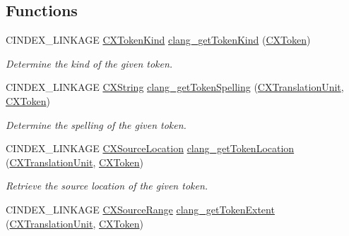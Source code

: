 \subsection*{Functions}
\begin{DoxyCompactItemize}
\item 
\mbox{\label{group__CINDEX__LEX_ga83f692a67fe4dbeea779f37c0a3b7f20}} 
C\+I\+N\+D\+E\+X\+\_\+\+L\+I\+N\+K\+A\+GE \mbox{\hyperlink{group__CINDEX__LEX_gaf63e37eee4280e2c039829af24bbc201}{C\+X\+Token\+Kind}} \mbox{\hyperlink{group__CINDEX__LEX_ga83f692a67fe4dbeea779f37c0a3b7f20}{clang\+\_\+get\+Token\+Kind}} (\mbox{\hyperlink{structCXToken}{C\+X\+Token}})
\begin{DoxyCompactList}\small\item\em Determine the kind of the given token. \end{DoxyCompactList}\item 
C\+I\+N\+D\+E\+X\+\_\+\+L\+I\+N\+K\+A\+GE \mbox{\hyperlink{structCXString}{C\+X\+String}} \mbox{\hyperlink{group__CINDEX__LEX_ga1033a25c9d2c59bcbdb23020de0bba2c}{clang\+\_\+get\+Token\+Spelling}} (\mbox{\hyperlink{group__CINDEX_gacdb7815736ca709ce9a5e1ec2b7e16ac}{C\+X\+Translation\+Unit}}, \mbox{\hyperlink{structCXToken}{C\+X\+Token}})
\begin{DoxyCompactList}\small\item\em Determine the spelling of the given token. \end{DoxyCompactList}\item 
\mbox{\label{group__CINDEX__LEX_ga76a721514acb4cc523e10a6913d88021}} 
C\+I\+N\+D\+E\+X\+\_\+\+L\+I\+N\+K\+A\+GE \mbox{\hyperlink{structCXSourceLocation}{C\+X\+Source\+Location}} \mbox{\hyperlink{group__CINDEX__LEX_ga76a721514acb4cc523e10a6913d88021}{clang\+\_\+get\+Token\+Location}} (\mbox{\hyperlink{group__CINDEX_gacdb7815736ca709ce9a5e1ec2b7e16ac}{C\+X\+Translation\+Unit}}, \mbox{\hyperlink{structCXToken}{C\+X\+Token}})
\begin{DoxyCompactList}\small\item\em Retrieve the source location of the given token. \end{DoxyCompactList}\item 
\mbox{\label{group__CINDEX__LEX_ga5acbc0a2a3c01aa44e1c5c5ccc4e328b}} 
C\+I\+N\+D\+E\+X\+\_\+\+L\+I\+N\+K\+A\+GE \mbox{\hyperlink{structCXSourceRange}{C\+X\+Source\+Range}} \mbox{\hyperlink{group__CINDEX__LEX_ga5acbc0a2a3c01aa44e1c5c5ccc4e328b}{clang\+\_\+get\+Token\+Extent}} (\mbox{\hyperlink{group__CINDEX_gacdb7815736ca709ce9a5e1ec2b7e16ac}{C\+X\+Translation\+Unit}}, \mbox{\hyperlink{structCXToken}{C\+X\+Token}})

\end{DoxyCompactItemize}
